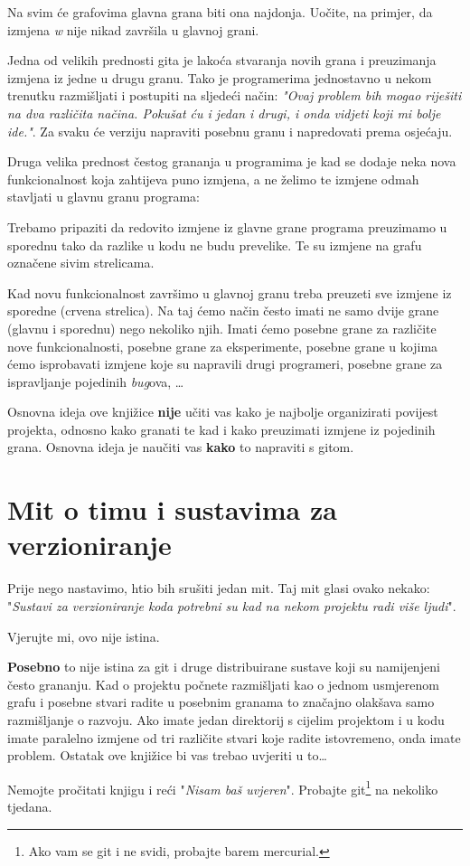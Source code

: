 

Na svim će grafovima glavna grana biti ona najdonja.
Uočite, na primjer, da izmjena \emph w nije nikad završila u glavnoj grani. 

Jedna od velikih prednosti gita je lakoća stvaranja novih grana i preuzimanja izmjena iz jedne u drugu granu. 
Tako je programerima jednostavno u nekom trenutku razmišljati i postupiti na sljedeći način: \emph{"Ovaj problem bih mogao riješiti na dva različita načina. Pokušat ću i jedan i drugi, i onda vidjeti koji mi bolje ide."}. Za svaku će verziju napraviti posebnu granu i napredovati prema osjećaju.

Druga velika prednost čestog grananja u programima je kad se dodaje neka nova funkcionalnost koja zahtijeva puno izmjena, a ne želimo te izmjene odmah stavljati u glavnu granu programa:



Trebamo pripaziti da redovito izmjene iz glavne grane programa preuzimamo u sporednu tako da razlike u kodu ne budu prevelike. 
Te su izmjene na grafu označene sivim strelicama.

Kad novu funkcionalnost završimo u glavnoj granu treba preuzeti sve izmjene iz sporedne (crvena strelica). Na taj ćemo način često imati ne samo dvije grane (glavnu i sporednu) nego nekoliko njih.
Imati ćemo posebne grane za različite nove funkcionalnosti, posebne grane za eksperimente, posebne grane u kojima ćemo isprobavati izmjene koje su napravili drugi programeri, posebne grane za ispravljanje pojedinih \emph{bug}ova, \dots

Osnovna ideja ove knjižice \textbf{nije} učiti vas kako je najbolje organizirati povijest projekta, odnosno kako granati te kad i kako preuzimati izmjene iz pojedinih grana.
Osnovna ideja je naučiti vas \textbf{kako} to napraviti s gitom. 

\section*{Mit o timu i sustavima za verzioniranje}

Prije nego nastavimo, htio bih srušiti jedan mit. 
Taj mit glasi ovako nekako: "\emph{Sustavi za verzioniranje koda potrebni su kad na nekom projektu radi više ljudi}".

Vjerujte mi, ovo nije istina.

\textbf{Posebno} to nije istina za git i druge distribuirane sustave koji su namijenjeni često grananju.
Kad o projektu počnete razmišljati kao o jednom usmjerenom grafu i posebne stvari radite u posebnim granama to značajno olakšava samo razmišljanje o razvoju.
Ako imate jedan direktorij s cijelim projektom i u kodu imate paralelno izmjene od tri različite stvari koje radite istovremeno, onda imate problem.
Ostatak ove knjižice bi vas trebao uvjeriti u to\dots

Nemojte pročitati knjigu i reći "\emph{Nisam baš uvjeren}". 
Probajte git\footnote{Ako vam se git i ne svidi, probajte barem mercurial.} na nekoliko tjedana.


